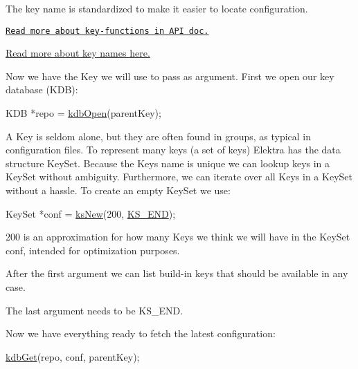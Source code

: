The key name is standardized to make it easier to locate configuration.


\begin{DoxyItemize}
\item \href{https://doc.libelektra.org/api/current/html/group__key.html}{\tt Read more about key-\/functions in A\+PI doc.}
\item \hyperlink{md_doc_help_elektra-key-names_doc_help_elektra-key-names_md}{Read more about key names here.}
\end{DoxyItemize}

Now we have the {\ttfamily Key} we will use to pass as argument. First we open our key database (K\+DB)\+:


\begin{DoxyCode}
KDB *repo = \hyperlink{group__kdb_ga6808defe5870f328dd17910aacbdc6ca}{kdbOpen}(parentKey);
\end{DoxyCode}


A {\ttfamily Key} is seldom alone, but they are often found in groups, as typical in configuration files. To represent many keys (a set of keys) Elektra has the data structure {\ttfamily Key\+Set}. Because the {\ttfamily Key}\textquotesingle{}s name is unique we can lookup keys in a {\ttfamily Key\+Set} without ambiguity. Furthermore, we can iterate over all {\ttfamily Key}s in a {\ttfamily Key\+Set} without a hassle. To create an empty {\ttfamily Key\+Set} we use\+:


\begin{DoxyCode}
KeySet *conf = \hyperlink{group__keyset_ga671e1aaee3ae9dc13b4834a4ddbd2c3c}{ksNew}(200, \hyperlink{kdbenum_8c_a7a28fce3773b2c873c94ac80b8b4cd54}{KS\_END});
\end{DoxyCode}



\begin{DoxyItemize}
\item 200 is an approximation for how many {\ttfamily Key}s we think we will have in the {\ttfamily Key\+Set} {\ttfamily conf}, intended for optimization purposes.
\item After the first argument we can list build-\/in keys that should be available in any case.
\item The last argument needs to be {\ttfamily K\+S\+\_\+\+E\+ND}.
\end{DoxyItemize}

Now we have everything ready to fetch the latest configuration\+:


\begin{DoxyCode}
\hyperlink{group__kdb_ga28e385fd9cb7ccfe0b2f1ed2f62453a1}{kdbGet}(repo, conf, parentKey);
\end{DoxyCode}


